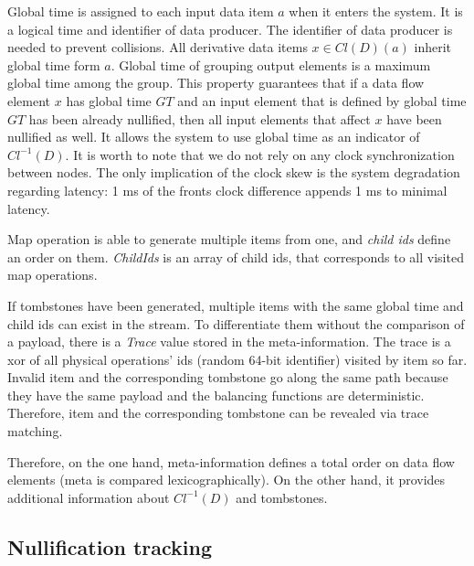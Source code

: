 Global time is assigned to each input data item $a$ when it enters the system. It is a logical time and identifier of data producer. The identifier of data producer is needed to prevent collisions. All derivative data items $x \in Cl(D)(a)$ inherit global time form $a$. Global time of grouping output elements is a maximum global time among the group. This property guarantees that if a data flow element $x$ has global time $GT$ and an input element that is defined by global time $GT$ has been already nullified, then all input elements that affect $x$ have been nullified as well. It allows the system to use global time as an indicator of $Cl^{-1}(D)$. It is worth to note that we do not rely on any clock synchronization between nodes. The only implication of the clock skew is the system degradation regarding latency: 1 ms of the fronts clock difference appends 1 ms to minimal latency.

Map operation is able to generate multiple items from one, and {\em child ids} define an order on them. {\it ChildIds} is an array of child ids, that corresponds to all visited map operations.

If tombstones have been generated, multiple items with the same global time and child ids can exist in the stream. To differentiate them without the comparison of a payload, there is a {\it Trace} value stored in the meta-information. The trace is a xor of all physical operations' ids (random 64-bit identifier) visited by item so far. Invalid item and the corresponding tombstone go along the same path because they have the same payload and the balancing functions are deterministic. Therefore, item and the corresponding tombstone can be revealed via trace matching. 

Therefore, on the one hand, meta-information defines a total order on data flow elements (meta is compared lexicographically). On the other hand, it provides additional information about $Cl^{-1}(D)$ and tombstones.

\subsection{Nullification tracking}



